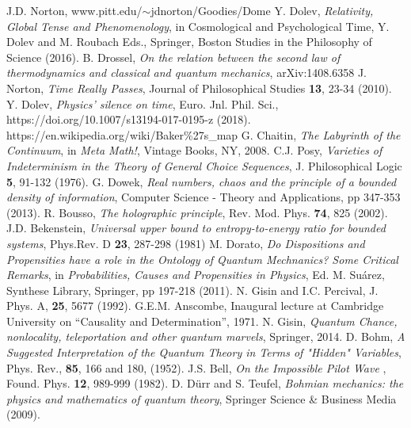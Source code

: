 \documentclass[pra,aps,groupedaddress,twocolumn,floatfix,nofootinbib]{revtex4}
\begin{document}
\begin{thebibliography}{99}

 J.D. Norton, www.pitt.edu/$\sim$jdnorton/Goodies/Dome
 Y. Dolev, {\it Relativity, Global Tense and Phenomenology}, in Cosmological and Psychological Time, Y. Dolev and M. Roubach Eds., Springer, Boston Studies in the Philosophy of Science (2016).
 B. Drossel, {\it On the relation between the second law of thermodynamics and classical and quantum mechanics}, arXiv:1408.6358
 J. Norton, {\it Time Really Passes}, Journal of Philosophical Studies {\bf13}, 23-34 (2010). 
 Y. Dolev, {\it Physics' silence on time}, Euro. Jnl. Phil. Sci., https://doi.org/10.1007/s13194-017-0195-z (2018).
 https://en.wikipedia.org/wiki/Baker\%27s\_map 
 G. Chaitin, {\it The Labyrinth of the Continuum}, in {\it Meta Math!}, Vintage Books, NY, 2008.
 C.J. Posy, {\it Varieties of Indeterminism in the Theory of General Choice Sequences}, J. Philosophical Logic {\bf 5}, 91-132 (1976).
 G. Dowek, {\it Real numbers, chaos and the principle of a bounded density of information}, Computer Science - Theory and Applications, pp 347-353 (2013). 
 R. Bousso, {\it The holographic principle}, Rev. Mod. Phys. {\bf 74}, 825 (2002).
 J.D. Bekenstein, {\it Universal upper bound to entropy-to-energy ratio for bounded systems}, Phys.Rev. D {\bf23}, 287-298 (1981)
 M. Dorato, {\it Do Dispositions and Propensities have a role in the Ontology of Quantum Mechnanics? Some Critical Remarks}, in {\it Probabilities, Causes and Propensities in Physics}, Ed. M. Su\'arez, Synthese Library, Springer, pp 197-218 (2011).
 N. Gisin and I.C. Percival, J. Phys. A, {\bf 25}, 5677 (1992).
 G.E.M. Anscombe, Inaugural lecture at Cambridge University on “Causality and Determination”, 1971.
 N. Gisin, {\it Quantum Chance, nonlocality, teleportation and other quantum marvels}, Springer, 2014.
D. Bohm, {\it A Suggested Interpretation of the Quantum Theory in Terms of "Hidden" Variables}, Phys. Rev., {\bf85}, 166 and 180, (1952).
 J.S. Bell, {\it On the Impossible Pilot Wave }, Found. Phys. {\bf 12}, 989-999 (1982).
 D. D\"urr and S. Teufel, {\it Bohmian mechanics: the physics and mathematics of quantum theory}, Springer Science \& Business Media (2009).

\end{thebibliography}
\end{document}
